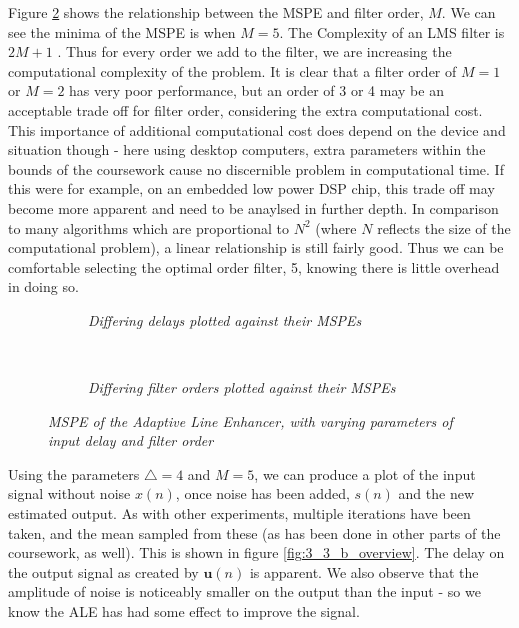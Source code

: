 \documentclass[./main.tex]{subfiles}
\begin{document}
Figure \ref{fig:3_3_b_order} shows the relationship between the MSPE and filter order, $M$. We can see the minima of the MSPE is when $M = 5$. The Complexity of an LMS filter is $ 2M + 1 $ \cite{Dhiman2013}. Thus for every order we add to the filter, we are increasing the computational complexity of the problem. It is clear that a filter order of $M = 1$ or $M=2$ has very poor performance, but an order of 3 or 4 may be an acceptable trade off for filter order, considering the extra computational cost. This importance of additional computational cost does depend on the device and situation though - here using desktop computers, extra parameters within the bounds of the coursework cause no discernible problem in computational time. If this were for example, on an embedded low power DSP chip, this trade off may become more apparent and need to be anaylsed in further depth. In comparison to many algorithms which are proportional to $ N^2 $ (where $N$ reflects the size of the computational problem), a linear relationship is still fairly good. Thus we can be comfortable selecting the optimal order filter, 5, knowing there is little overhead in doing so.

\begin{figure}[h]
	\centering
	\begin{subfigure}[b]{0.49\textwidth}
		\resizebox{\textwidth}{2in}{}
		\caption{\textit{Differing delays plotted against their MSPEs}}
		\label{fig:3_3_b_delay}
	\end{subfigure}
	~ %
	\begin{subfigure}[b]{0.49\textwidth}
		\resizebox{\textwidth}{2in}{}
		\caption{\textit{Differing filter orders plotted against their MSPEs}}
		\label{fig:3_3_b_order}
	\end{subfigure}
	
	\label{fig:3_3_b_sweeps}
	\caption{\textit{MSPE of the Adaptive Line Enhancer, with varying parameters of input delay and filter order}}
\end{figure}

Using the parameters $ \bigtriangleup = 4$ and $ M = 5$, we can produce a plot of the input signal without noise $x(n)$, once noise has been added, $s(n)$ and the new estimated output. As with other experiments, multiple iterations have been taken, and the mean sampled from these (as has been done in other parts of the coursework, as well). This is shown in figure \ref{fig:3_3_b_overview}. The delay on the output signal as created by $ \mathbf{u}(n) $ is apparent. We also observe that the amplitude of noise is noticeably smaller on the output than the input - so we know the ALE has had some effect to improve the signal.
\end{document}
